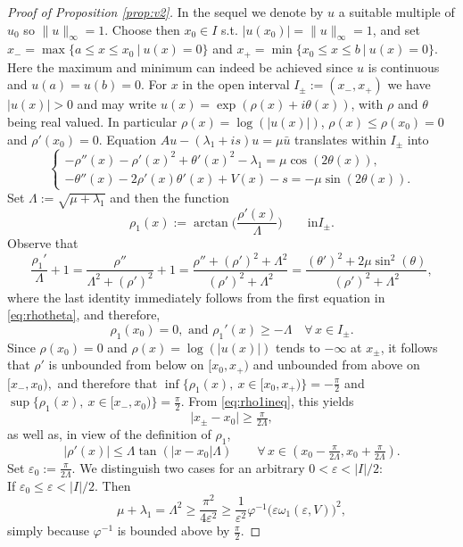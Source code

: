 \documentclass[12pt]{article}
\newcommand{\eps}{\varepsilon}
\begin{document}
\begin{proof}[Proof of Proposition \ref{prop:v2}]
In the sequel we denote by $u$ a suitable multiple of $u_0$   so $\|u\|_\infty = 1.$ 
Choose then $x_0 \in I$ s.t. $|u(x_0)| = \|u\|_\infty = 1$, and set 
$x_- = \max\{a \leq x \leq x_0 \ | \ u(x) = 0\}$ and 
$x_+ = \min\{x_0 \leq x \leq b \ | \ u(x) = 0\}$. Here the maximum and minimum can 
indeed be achieved since $u$ is continuous and $u(a)=u(b)=0$. For $x$ in the open 
interval $I_\pm := (x_-,x_+)$ we have $|u(x)|> 0$ and may write 
$u(x) = \exp(\rho(x) + i \theta(x))$, with $\rho$ and $\theta$ being real 
valued. In particular $\rho(x) = \log(|u(x)|)$, $\rho(x)\leq \rho(x_0) = 0$ 
and $\rho'(x_0)=0$.  
Equation $Au - (\lambda_1 + i s)u = \mu \bar{u}$ translates within $I_\pm$ into
\begin{equation}\label{eq:rhotheta}
\left\{
\begin{array}{l}
-\rho''(x) - \rho'(x)^2 + \theta'(x)^2 - \lambda_1 = \mu \cos(2\theta(x)),\\
-\theta''(x) - 2\rho'(x)\theta'(x) + V(x) - s = -\mu \sin(2\theta(x)).
\end{array}
\right.
\end{equation}
Set $\Lambda := \sqrt{\mu + \lambda_1}$ and then the function 
$$
\rho_1(x) := \arctan\big(\frac{\rho'(x)}{\Lambda}\big) \qquad\text{in
}I_\pm.
$$
Observe that 
$$
\frac{\rho_1'}{\Lambda} + 1 = \frac{\rho''}{\Lambda^2 + (\rho')^2} + 1 = \frac{\rho'' +
(\rho')^2 + \Lambda^2}{(\rho')^2 + \Lambda^2} = \frac{(\theta')^2 + 2\mu
\sin^2(\theta)}{(\rho')^2 + \Lambda^2},
$$
where the last identity immediately follows from the first equation in
\eqref{eq:rhotheta}, and therefore, 
\begin{equation}\label{eq:rho1ineq}
\rho_1(x_0) = 0, \text{ and } \rho_1'(x) \geq - \Lambda \quad
\forall\, x \in I_\pm.
\end{equation}
Since $\rho(x_0) = 0$ and $\rho(x) = \log(|u(x)|)$ tends to $-\infty$ at
$x_\pm$, it follows that $\rho'$ is unbounded from below on $[x_0,x_+)$ 
and unbounded from above on $[x_-,x_0),$ and therefore that 
$\inf \{\rho_1(x),\ x \in [x_0,x_+)\} = -\frac{\pi}{2}$ and $\sup \{\rho_1(x),\ x 
\in [x_-,x_0)\} = \frac{\pi}{2}.$
From \eqref{eq:rho1ineq}, this yields
\begin{equation}\label{eq:bornexpm}
\big| x_\pm - x_0 \big| \geq \tfrac{\pi}{2\Lambda},
\end{equation}
as well as, in view of the definition of $\rho_1$, 
\begin{equation}\label{eq:bornerhoprime}
\big|\rho'(x)\big| \leq \Lambda \tan(|x-x_0|\Lambda)\qquad \forall\, x \in
(x_0-\tfrac{\pi}{2\Lambda},x_0+\tfrac{\pi}{2\Lambda}).
\end{equation}
Set $\eps_0 :=  \frac{\pi}{2\Lambda}$. We distinguish two cases for an arbitrary $0 < \eps < |I| / 2$:\\
 If $\eps_0 \leq \eps < |I|/2$. Then 
\begin{equation}\label{eq:ok1}
\mu + \lambda_1 = \Lambda^2 \geq \frac{\pi^2}{4\eps^2} \geq \frac{1}{\eps^2}
\varphi^{-1}\big(\eps\omega_1(\eps, V)\big)^2,
\end{equation}
simply because $\varphi^{-1}$ is bounded above by $\frac{\pi}{2}.$ 


\end{proof}
\end{document}
